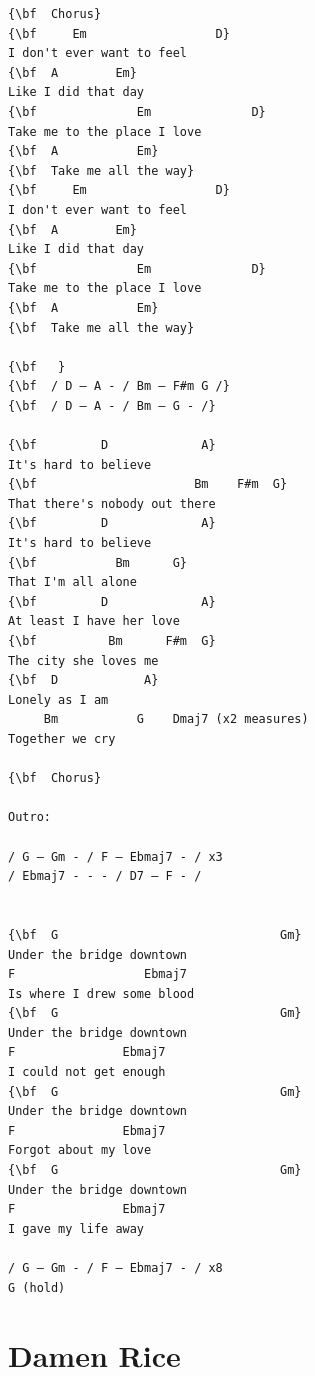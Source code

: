 \documentclass[a4paper]{article}
\begin{document}
\begin{Verbatim}[commandchars=\\\{\}]
{\bf  Chorus}
{\bf     Em                  D}
I don't ever want to feel
{\bf  A        Em}
Like I did that day
{\bf              Em              D}
Take me to the place I love
{\bf  A           Em}
{\bf  Take me all the way}
{\bf     Em                  D}
I don't ever want to feel
{\bf  A        Em}
Like I did that day
{\bf              Em              D}
Take me to the place I love
{\bf  A           Em}
{\bf  Take me all the way}

{\bf   }
{\bf  / D – A - / Bm – F#m G /}
{\bf  / D – A - / Bm – G - /}

{\bf         D             A}
It's hard to believe
{\bf                      Bm    F#m  G}
That there's nobody out there
{\bf         D             A}
It's hard to believe
{\bf           Bm      G}
That I'm all alone
{\bf         D             A}
At least I have her love
{\bf          Bm      F#m  G}
The city she loves me
{\bf  D            A}
Lonely as I am
     Bm           G    Dmaj7 (x2 measures)
Together we cry

{\bf  Chorus}

Outro:

/ G – Gm - / F – Ebmaj7 - / x3
/ Ebmaj7 - - - / D7 – F - /


{\bf  G                               Gm}
Under the bridge downtown
F                  Ebmaj7
Is where I drew some blood
{\bf  G                               Gm}
Under the bridge downtown
F               Ebmaj7
I could not get enough
{\bf  G                               Gm}
Under the bridge downtown
F               Ebmaj7
Forgot about my love
{\bf  G                               Gm}
Under the bridge downtown
F               Ebmaj7
I gave my life away

/ G – Gm - / F – Ebmaj7 - / x8
G (hold)

\end{Verbatim}
\newpage
\section{Damen Rice}
\end{document}
